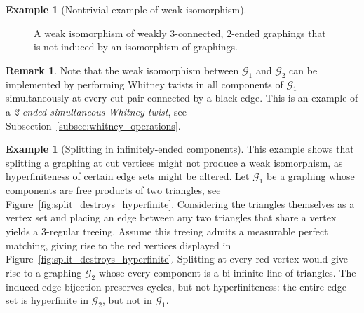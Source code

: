 \documentclass{article}
\theoremstyle{plain}
\theoremstyle{definition}
\newtheorem{ex}[thm]{Example}
\newtheorem{rem}[thm]{Remark}
\newcommand{\cG}{\mathcal{G}}
\begin{document}
\begin{ex}[Nontrivial example of weak isomorphism]
\begin{figure}[htb]
\begin{center}
\end{center}
\caption{A weak isomorphism of weakly $3$-connected, $2$-ended graphings that is not induced by an isomorphism of graphings. \label{fig:infinite_ladder_twist}}
\end{figure}
\end{ex}

\begin{rem}
    Note that the weak isomorphism between $\cG_1$ and $\cG_2$ can be implemented by performing Whitney twists in all components of $\cG_1$ simultaneously at every cut pair connected by a black edge. This is an example of a \emph{2-ended simultaneous Whitney twist}, see Subsection~\ref{subsec:whitney_operations}.
\end{rem}



\begin{ex}[Splitting in infinitely-ended components]\label{ex:traingle_tree}
This example shows that splitting a graphing at cut vertices might not produce a weak isomorphism, as hyperfiniteness of certain edge sets might be altered. Let $\cG_1$ be a graphing whose components are free products of two triangles, see Figure~\ref{fig:split_destroys_hyperfinite}. Considering the triangles themselves as a vertex set and placing an edge between any two triangles that share a vertex yields a $3$-regular treeing. Assume this treeing admits a measurable perfect matching, giving rise to the red vertices displayed in Figure~\ref{fig:split_destroys_hyperfinite}. Splitting at every red vertex would give rise to a graphing $\cG_2$ whose every component is a bi-infinite line of triangles. The induced edge-bijection preserves cycles, but not hyperfiniteness: the entire edge set is hyperfinite in $\cG_2$, but not in $\cG_1$. 
\end{ex}
\end{document}
